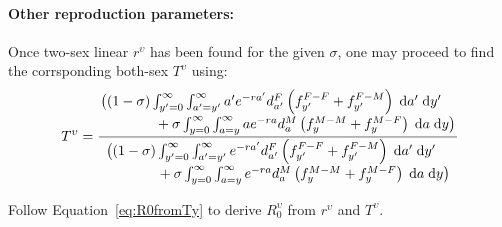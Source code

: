 \paragraph{Other reproduction parameters:}
\label{sec:2sexlinearother}
Once two-sex linear $r^\upsilon$ has been found for the given $\sigma$, one may
proceed to find the corrsponding both-sex $T^\upsilon$ using:
\begin{equation}
T^\upsilon = \frac{\splitfrac{
   \big((1 - \sigma)  \int _{y'=0}^\infty \int_{a'=y'}^\infty 
       a'e^{-ra'} d_{a'}^F \left( f_{y'}^{F-F} + f_{y'}^{F-M} \right) \dd a'\dd
       y'}{ + \sigma \int_{y=0}^\infty \int _{a=y}^\infty a e^{-ra}d_{a}^M 
       \left( f_{y}^{M-M}+ f_{y}^{M-F} \right) \dd a \dd y \big)}}{\splitfrac{\big( (1 - \sigma) 
   \int_{y'=0}^\infty \int_{a'=y'}^\infty e^{-ra'} d_{a'}^F \left( f_{y'}^{F-F}
   + f_{y'}^{F-M} \right) \dd a'\dd y'}{ +\sigma \int _{y=0}^\infty
   \int_{a=y}^\infty e^{-ra} d_{a}^M \left( f_{y}^{M-M} + f_{y}^{M-F} \right)
   \dd a \dd y \big)}}
\end{equation}

Follow Equation~\eqref{eq:R0fromTy} to derive $R_0^\upsilon$ from $r^\upsilon$
and $T^\upsilon$. 

